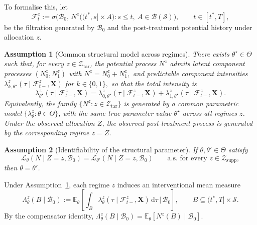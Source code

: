 \documentclass{statsoc}
\newtheorem{assumption}[assumption]{Assumption}
\newcommand{\bbE}{\mathbb{E}}
\newcommand{\dd}{\mathrm{d}}
\newcommand{\1}{\mathbbm{1}}
\newcommand{\CovX}{\mathbf{X}}
\newcommand{\Nproc}{N}
\newcommand{\Nzero}{N_0}
\newcommand{\None}{N_1}
\begin{document}
To formalise this, let
\[
\mathcal F_t^z
:=
\sigma\!\Big(
\mathcal B_0,\,
\Nproc^z\big((t^\ast,s]\times A\big):s\le t,\ A\in\mathcal B(\mathcal S)
\Big),
\qquad t\in[t^\ast,T],
\]
be the filtration generated by \(\mathcal B_0\) and the post-treatment potential history under allocation \(z\).

\begin{assumption}[Common structural model across regimes]\label{ass:id-structural}
There exists \(\theta^\star\in\Theta\) such that, for every \(z\in\mathcal Z_{\mathrm{tar}}\), the potential process \(\Nproc^z\) admits latent component processes \((\Nzero^z,\None^z)\) with
\(
\Nproc^z=\Nzero^z+\None^z,
\)
and predictable component intensities
\(
\lambda_{k,\theta^\star}^z(\tau\mid \mathcal F_{t-}^z,\CovX)\) for \( k\in\{0,1\},
\)
so that the total intensity is
\[
\lambda_{\theta^\star}^z(\tau\mid \mathcal F_{t-}^z,\CovX)
=
\lambda_{0,\theta^\star}^z(\tau\mid \mathcal F_{t-}^z,\CovX)
+
\lambda_{1,\theta^\star}^z(\tau\mid \mathcal F_{t-}^z,\CovX).
\]
Equivalently, the family \(\{\Nproc^z:z\in\mathcal Z_{\mathrm{tar}}\}\) is generated by a common parametric model \(\{\lambda_\theta^z:\theta\in\Theta\}\), with the same true parameter value \(\theta^\star\) across all regimes \(z\). Under the observed allocation \(Z\), the observed post-treatment process is generated by the corresponding regime \(z=Z\).
\end{assumption}

\begin{assumption}[Identifiability of the structural parameter]\label{ass:id-theta}
If \(\theta,\theta'\in\Theta\) satisfy
\[
\mathcal L_\theta\!\left(\Nproc\mid Z=z,\mathcal B_0\right)
=
\mathcal L_{\theta'}\!\left(\Nproc\mid Z=z,\mathcal B_0\right)
\qquad\text{a.s. for every } z\in\mathcal Z_{\mathrm{supp}},
\]
then \(\theta=\theta'\).
\end{assumption}

Under Assumption~\ref{ass:id-structural}, each regime \(z\) induces an interventional mean measure
\begin{equation}\label{eq:id-mean-measure}
\Lambda_\theta^z(B\mid \mathcal B_0)
:=
\bbE_\theta\!\left[
\int_B \lambda_\theta^z(\tau\mid \mathcal F_{t-}^z,\CovX)\,\dd\tau
\,\Big|\, \mathcal B_0
\right],
\qquad B\subseteq (t^\ast,T]\times\mathcal S.
\end{equation}
By the compensator identity, \(\Lambda_\theta^z(B\mid \mathcal B_0)=\bbE_\theta[\Nproc^z(B)\mid \mathcal B_0]\).
\end{document}
